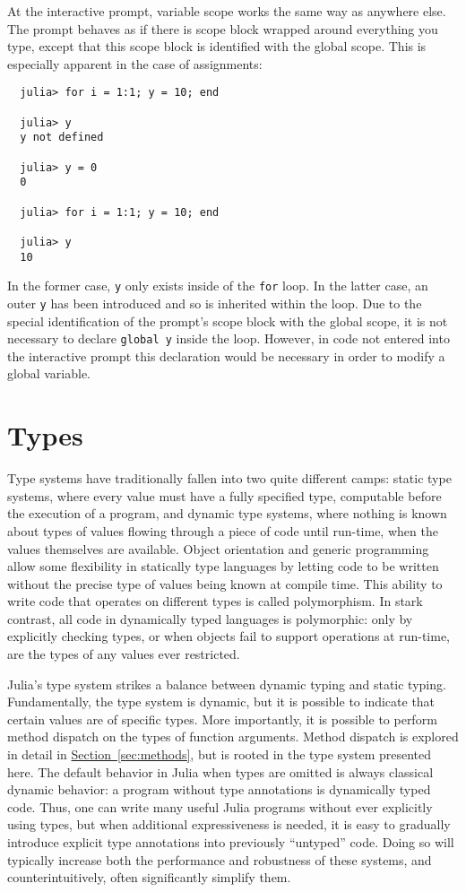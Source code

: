 \documentclass{article}
\renewcommand{\sec}[1]{\label{sec:#1}}
\newcommand{\Section}[1]{\hyperref[sec:#1]{Section~\ref*{sec:#1}}}
\begin{document}
At the interactive prompt, variable scope works the same way as anywhere
else. The prompt behaves as if there is scope block wrapped around everything
you type, except that this scope block is identified with the global scope.
This is especially apparent in the case of assignments:
\begin{verbatim}
  julia> for i = 1:1; y = 10; end
  
  julia> y
  y not defined
  
  julia> y = 0
  0
  
  julia> for i = 1:1; y = 10; end
  
  julia> y
  10
\end{verbatim}
In the former case, \verb|y| only exists inside of the \verb|for| loop.
In the latter case, an outer \verb|y| has been introduced and so is inherited
within the loop. Due to the special identification of the prompt's scope
block with the global scope, it is not necessary to declare
\verb|global y| inside the loop. However, in code not entered into the interactive prompt
this declaration would be necessary in order to modify a global variable.

\section{Types}\sec{types}

Type systems have traditionally fallen into two quite different camps:
static type systems, where every value must have a fully specified type, computable before the execution of a program, and dynamic type systems, where nothing is known about types of values flowing through a piece of code until run-time, when the values themselves are available.
Object orientation and generic programming allow some flexibility in statically type languages by letting code to be written without the precise type of values being known at compile time.
This ability to write code that operates on different types is called polymorphism.
In stark contrast, all code in dynamically typed languages is polymorphic:
only by explicitly checking types, or when objects fail to support operations at run-time, are the types of any values ever restricted.

Julia's type system strikes a balance between dynamic typing and static typing.
Fundamentally, the type system is dynamic, but it is possible to indicate that certain values are of specific types.
More importantly, it is possible to perform method dispatch on the types of function arguments.
Method dispatch is explored in detail in \Section{methods}, but is rooted in the type system presented here.
The default behavior in Julia when types are omitted is always classical dynamic behavior:
a program without type annotations is dynamically typed code.
Thus, one can write many useful Julia programs without ever explicitly using types, but when additional expressiveness is needed, it is easy to gradually introduce explicit type annotations into previously ``untyped'' code.
Doing so will typically increase both the performance and robustness of these systems, and counterintuitively, often significantly simplify them.
\end{document}
